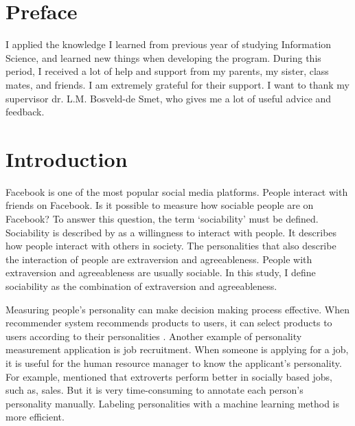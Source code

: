 \documentclass[
10pt, %
a4paper, %
oneside, %
headinclude,footinclude, %
] {book}%
\begin{document}
\chapter*{Preface}

I applied the knowledge I learned from previous year of studying Information Science, and learned new things when developing the program. During this period, I received a lot of help and support from my parents, my sister, class mates, and friends. I am extremely grateful for their support. I want to thank my supervisor dr. L.M. Bosveld-de Smet, who gives me a lot of useful advice and feedback.



\chapter{Introduction}

Facebook is one of the most popular social media platforms. People interact with friends on Facebook. Is it possible to measure how sociable people are on Facebook? To answer this question, the term ‘sociability’ must be defined. Sociability is described by \citet{cheek1981shyness} as a willingness to interact with people. It describes how people interact with others in society. The personalities that also describe the interaction of people are extraversion and agreeableness. People with extraversion and agreeableness are usually sociable. In this study, I define sociability as the combination of extraversion and agreeableness.

Measuring people’s personality can make decision making process effective. When recommender system recommends products to users, it can select products to users according to their personalities \citep{tkalcic2009personality}. Another example of personality measurement application is job recruitment. When someone is applying for a job, it is useful for the human resource manager to know the applicant’s personality. For example, \citet{Barrick1991big} mentioned that extroverts perform better in socially based jobs, such as, sales. But it is very time-consuming to annotate each person's personality manually. Labeling personalities with a machine learning method is more efficient. 
\end{document}
